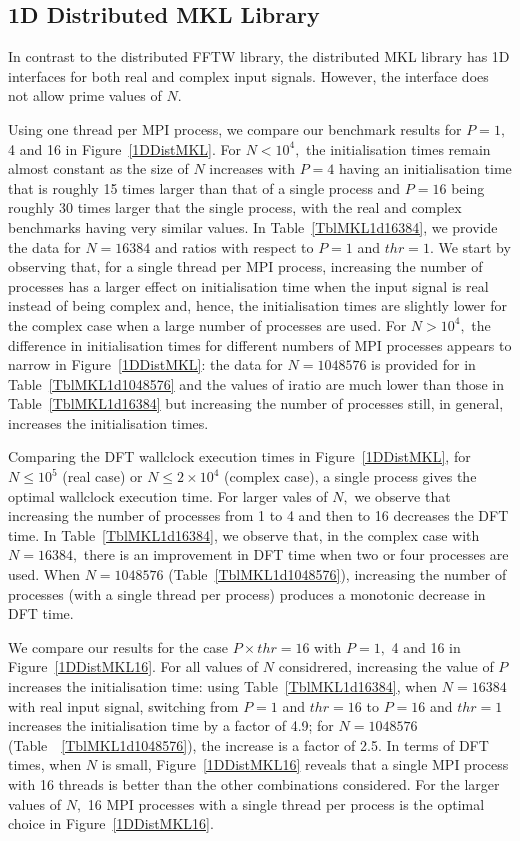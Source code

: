\documentclass[a4paper]{article}
\begin{document}
\subsection{1D Distributed MKL Library}\label{Sec:1DDistMKL}
In contrast to the distributed FFTW library, the distributed MKL
library has 1D interfaces for both real and complex input
signals. However, the interface does not allow prime values of $N.$


Using one thread per MPI process, we compare our benchmark results for
$P=1,$ 4 and 16 in Figure~\ref{1DDistMKL}. For $N<10^4,$ the
initialisation times remain almost constant as the size of $N$
increases with $P=4$ having an initialisation time that is roughly 15
times larger than that of a single process and $P=16$ being roughly 30
times larger that the single process, with the real and complex
benchmarks having very similar values. In Table~\ref{TblMKL1d16384},
we provide the data for $N=16384$ and ratios with respect to $P=1$ and
$thr=1.$ We start by observing that, for a single thread per MPI
process, increasing the number of processes has a larger effect on
initialisation time when the input signal is real instead of being
complex and, hence, the initialisation times are slightly lower for
the complex case when a large number of processes are used. For
$N>10^4,$ the difference in initialisation times for different numbers
of MPI processes appears to narrow in Figure~\ref{1DDistMKL}: the data
for $N=1048576$ is provided for in Table~\ref{TblMKL1d1048576} and
the values of iratio are much lower than those in
Table~\ref{TblMKL1d16384} but increasing the number of processes
still, in general, increases the initialisation times.

Comparing the DFT wallclock execution times in Figure~\ref{1DDistMKL},
for $N\le 10^5$ (real case) or $N\le 2\times 10^4$ (complex case), a
single process gives the optimal wallclock execution time. For larger
vales of $N,$ we observe that increasing the number of processes from
1 to 4 and then to 16 decreases the DFT time. In
Table~\ref{TblMKL1d16384}, we observe that, in the complex case with
$N=16384,$ there is an improvement in DFT time when two or four
processes are used. When $N=1048576$ (Table~\ref{TblMKL1d1048576}),
increasing the number of processes (with a single thread per process)
produces a monotonic decrease in DFT time.

We compare our results for the case $P\times thr=16$ with $P=1,$ 4 and
16 in Figure~\ref{1DDistMKL16}. For all values of $N$ considrered,
increasing the value of $P$ increases the initialisation time: using
Table~\ref{TblMKL1d16384}, when $N=16384$ with real input signal,
switching from $P=1$ and $thr=16$ to $P=16$ and $thr=1$ increases the
initialisation time by a factor of 4.9; for $N=1048576$
(Table~~\ref{TblMKL1d1048576}), the increase is a factor of 2.5. In
terms of DFT times, when $N$ is small, Figure~\ref{1DDistMKL16}
reveals that a single MPI process with 16 threads is better than the
other combinations considered. For the larger values of $N,$ 16 MPI
processes with a single thread per process is the optimal choice in
Figure~\ref{1DDistMKL16}. 
\end{document}
